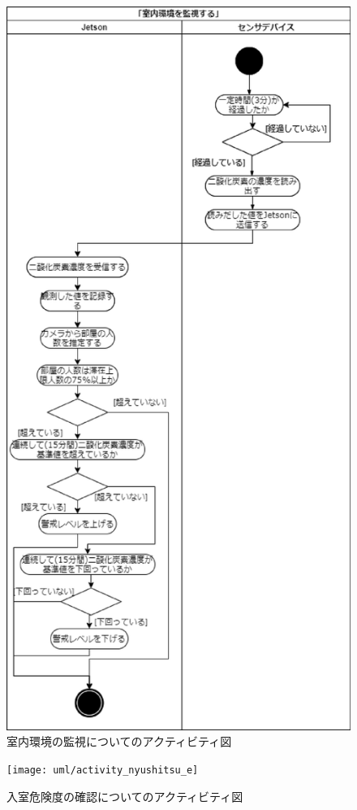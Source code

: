 \begin{figure}
	\centering
	\includegraphics[width=0.6\linewidth]{uml/activity_kanshi_1}
	\caption{室内環境の監視についてのアクティビティ図}
	\label{activitykanshi}
\end{figure}

\begin{figure}
	\centering
	\texttt{[image: uml/activity\_nyushitsu\_e]}
	\caption{入室危険度の確認についてのアクティビティ図}
	\label{activitynyushitsu}
\end{figure}

